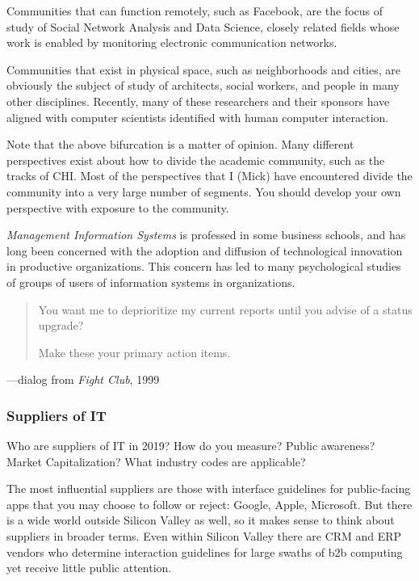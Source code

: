 Communities that can function remotely, such as Facebook, are the focus
of study of Social Network Analysis and Data Science, closely related
fields whose work is enabled by monitoring electronic communication
networks.

Communities that exist in physical space, such as neighborhoods and
cities, are obviously the subject of study of architects, social
workers, and people in many other disciplines. Recently, many of these
researchers and their sponsors have aligned with computer scientists
identified with human computer interaction.

Note that the above bifurcation is a matter of opinion. Many different
perspectives exist about how to divide the academic community, such as
the tracks of CHI. Most of the perspectives that I (Mick) have
encountered divide the community into a very large number of segments.
You should develop your own perspective with exposure to the community.

\emph{Management Information Systems} is professed in some business
schools, and has long been concerned with the adoption and diffusion of
technological innovation in productive organizations. This concern has
led to many psychological studies of groups of users of information
systems in organizations.

\hypertarget{industrial-and-government-communities}{%
\label{industrial-and-government-communities}}

\begin{quotation}
\noindent
You want me to deprioritize
my current reports until you advise
of a status upgrade?

\medskip

\noindent
Make these your primary
action items.
\end{quotation}

\hfill ---dialog from \emph{Fight Club}, 1999

\hypertarget{suppliers-of-it}{%
\subsubsection{Suppliers of IT}\label{suppliers-of-it}}

Who are suppliers of IT in 2019? How do you measure? Public awareness?
Market Capitalization? What industry codes are applicable?

The most influential suppliers are those with interface guidelines for
public-facing apps that you may choose to follow or reject: Google,
Apple, Microsoft. But there is a wide world outside Silicon Valley as
well, so it makes sense to think about suppliers in broader terms. Even
within Silicon Valley there are CRM and ERP vendors who determine
interaction guidelines for large swaths of b2b computing yet receive
little public attention.

